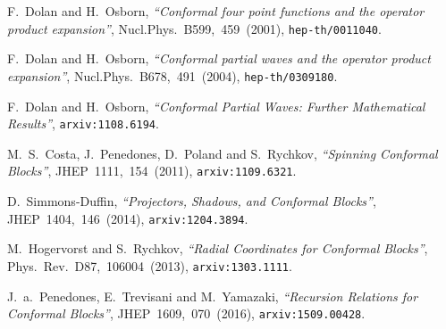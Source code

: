 \documentclass{article}
\begin{document}
\begin{thebibliography}{10}
\providecommand{\href}[2]{#2}
\providecommand{\arxivref}[2]{\href{http://arxiv.org/abs/#1}{#2}}
\providecommand{\doiref}[2]{\href{http://dx.doi.org/#1}{#2}}
\providecommand{\nbbstauthor}[1]{#1}
\providecommand{\nbbstjournal}[1]{\textsf{#1}}
\providecommand{\nbbsttitle}[1]{\textit{``#1''}}
\providecommand{\nbbsturl}[1]{\texttt{#1}}
\providecommand{\nbbsteprint}[1]{\texttt{#1}}
\providecommand{\nbbststyle}{\raggedright\small\parskip0pt}
\nbbststyle

\nbbstauthor{F.~Dolan and H.~Osborn},
\nbbsttitle{{Conformal four point functions and the operator product
  expansion}},
\nbbstjournal{\doiref{10.1016/S0550-3213(01)00013-X}{Nucl.Phys.~B599,~459~(2001)}},
\nbbsteprint{\arxivref{hep-th/0011040}{hep-th/0011040}}.

\nbbstauthor{F.~Dolan and H.~Osborn},
\nbbsttitle{{Conformal partial waves and the operator product expansion}},
\nbbstjournal{\doiref{10.1016/j.nuclphysb.2003.11.016}{Nucl.Phys.~B678,~491~(2004)}},
\nbbsteprint{\arxivref{hep-th/0309180}{hep-th/0309180}}.

\nbbstauthor{F.~Dolan and H.~Osborn},
\nbbsttitle{{Conformal Partial Waves: Further Mathematical Results}},
\nbbsteprint{\arxivref{1108.6194}{arxiv:1108.6194}}.

\nbbstauthor{M.~S.~Costa, J.~Penedones, D.~Poland and S.~Rychkov},
\nbbsttitle{{Spinning Conformal Blocks}},
\nbbstjournal{\doiref{10.1007/JHEP11(2011)154}{JHEP~1111,~154~(2011)}},
\nbbsteprint{\arxivref{1109.6321}{arxiv:1109.6321}}.

\nbbstauthor{D.~Simmons-Duffin},
\nbbsttitle{{Projectors, Shadows, and Conformal Blocks}},
\nbbstjournal{\doiref{10.1007/JHEP04(2014)146}{JHEP~1404,~146~(2014)}},
\nbbsteprint{\arxivref{1204.3894}{arxiv:1204.3894}}.

\nbbstauthor{M.~Hogervorst and S.~Rychkov},
\nbbsttitle{{Radial Coordinates for Conformal Blocks}},
\nbbstjournal{\doiref{10.1103/PhysRevD.87.106004}{Phys.~Rev.~D87,~106004~(2013)}},
\nbbsteprint{\arxivref{1303.1111}{arxiv:1303.1111}}.

\nbbstauthor{J.~a.~Penedones, E.~Trevisani and M.~Yamazaki},
\nbbsttitle{{Recursion Relations for Conformal Blocks}},
\nbbstjournal{\doiref{10.1007/JHEP09(2016)070}{JHEP~1609,~070~(2016)}},
\nbbsteprint{\arxivref{1509.00428}{arxiv:1509.00428}}.


\end{thebibliography}
\end{document}
